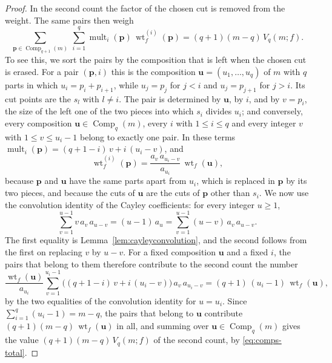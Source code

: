 \documentclass{amsart}
\theoremstyle{definition}
\theoremstyle{remark}
\numberwithin{equation}{section}
\begin{document}
\begin{proof}
In the second count the factor of the chosen cut is removed from the weight. The same pairs then weigh
\begin{equation}\label{eq:comps-erased}
\sum_{\mathbf p\in\operatorname{Comp}_{q+1}(m)}\ \sum_{i=1}^{q}\operatorname{mult}_i(\mathbf p)\,\operatorname{wt}_f^{(i)}(\mathbf p)=(q+1)(m-q)\,V_q(m;f).
\end{equation}
To see this, we sort the pairs by the composition that is left when the chosen cut is erased. For a pair $(\mathbf p,i)$ this is the composition $\mathbf u=(u_1,\dots,u_q)$ of $m$ with $q$ parts in which $u_i=p_i+p_{i+1}$, while $u_j=p_j$ for $j<i$ and $u_j=p_{j+1}$ for $j>i$. Its cut points are the $s_l$ with $l\ne i$. The pair is determined by $\mathbf u$, by $i$, and by $v=p_i$, the size of the left one of the two pieces into which $s_i$ divides $u_i$; and conversely, every composition $\mathbf u\in\operatorname{Comp}_q(m)$, every $i$ with $1\le i\le q$ and every integer $v$ with $1\le v\le u_i-1$ belong to exactly one pair. In these terms $\operatorname{mult}_i(\mathbf p)=(q+1-i)\,v+i\,(u_i-v)$, and
\[
\operatorname{wt}_f^{(i)}(\mathbf p)=\frac{a_v\,a_{u_i-v}}{a_{u_i}}\,\operatorname{wt}_f(\mathbf u),
\]
because $\mathbf p$ and $\mathbf u$ have the same parts apart from $u_i$, which is replaced in $\mathbf p$ by its two pieces, and because the cuts of $\mathbf u$ are the cuts of $\mathbf p$ other than $s_i$. We now use the convolution identity of the Cayley coefficients: for every integer $u\ge 1$,
\[
\sum_{v=1}^{u-1}v\,a_v\,a_{u-v}=(u-1)\,a_u=\sum_{v=1}^{u-1}(u-v)\,a_v\,a_{u-v}.
\]
The first equality is Lemma~\ref{lem:cayleyconvolution}, and the second follows from the first on replacing $v$ by $u-v$. For a fixed composition $\mathbf u$ and a fixed $i$, the pairs that belong to them therefore contribute to the second count the number
\[
\frac{\operatorname{wt}_f(\mathbf u)}{a_{u_i}}\sum_{v=1}^{u_i-1}\bigl((q+1-i)\,v+i\,(u_i-v)\bigr)\,a_v\,a_{u_i-v}=(q+1)\,(u_i-1)\,\operatorname{wt}_f(\mathbf u),
\]
by the two equalities of the convolution identity for $u=u_i$. Since $\sum_{i=1}^{q}(u_i-1)=m-q$, the pairs that belong to $\mathbf u$ contribute $(q+1)(m-q)\,\operatorname{wt}_f(\mathbf u)$ in all, and summing over $\mathbf u\in\operatorname{Comp}_q(m)$ gives the value $(q+1)(m-q)\,V_q(m;f)$ of the second count, by \eqref{eq:comps-total}.


\end{proof}
\end{document}
